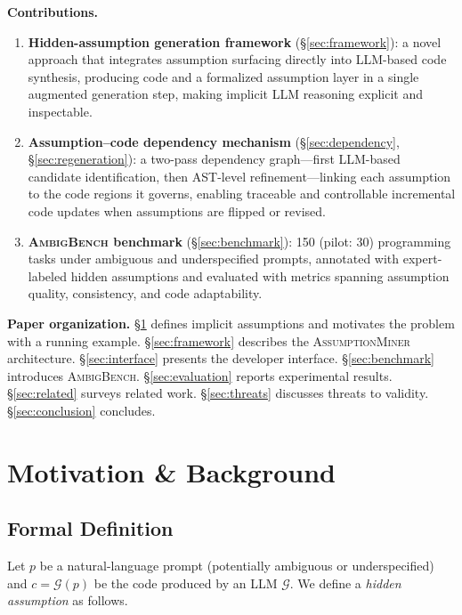 \documentclass[sigconf,review,anonymous]{acmart}
\newcommand{\sysname}{\textsc{AssumptionMiner}\xspace}
\newcommand{\benchname}{\textsc{AmbigBench}\xspace}
\newcommand{\NumBenchmarkTasks}{150 (pilot: 30)\xspace}
\begin{document}
\noindent\textbf{Contributions.}
\begin{enumerate}[leftmargin=*, label=(\arabic*)]
  \item \textbf{Hidden-assumption generation framework} (\S\ref{sec:framework}): a novel
        approach that integrates assumption surfacing directly into LLM-based code
        synthesis, producing code and a formalized assumption layer in a single augmented
        generation step, making implicit LLM reasoning explicit and inspectable.
  \item \textbf{Assumption--code dependency mechanism} (\S\ref{sec:dependency},
        \S\ref{sec:regeneration}): a two-pass dependency graph---first LLM-based
        candidate identification, then AST-level refinement---linking each
        assumption to the code regions it governs, enabling traceable and controllable
        incremental code updates when assumptions are flipped or revised.
  \item \textbf{\benchname benchmark} (\S\ref{sec:benchmark}): \NumBenchmarkTasks
        programming tasks under ambiguous and underspecified prompts, annotated with
        expert-labeled hidden assumptions and evaluated with metrics spanning assumption
        quality, consistency, and code adaptability.
\end{enumerate}

\noindent\textbf{Paper organization.}
\S\ref{sec:background} defines implicit assumptions and motivates the problem with a
running example.  \S\ref{sec:framework} describes the \sysname architecture.
\S\ref{sec:interface} presents the developer interface.  \S\ref{sec:benchmark} introduces
\benchname.  \S\ref{sec:evaluation} reports experimental results.
\S\ref{sec:related} surveys related work.  \S\ref{sec:threats} discusses threats to
validity.  \S\ref{sec:conclusion} concludes.

\section{Motivation \& Background}
\label{sec:background}

\subsection{Formal Definition}
\label{sec:definition}

Let $p$ be a natural-language prompt (potentially ambiguous or underspecified) and
$c = \mathcal{G}(p)$ be the code produced by an LLM $\mathcal{G}$.
We define a \emph{hidden assumption} as follows.
\end{document}
